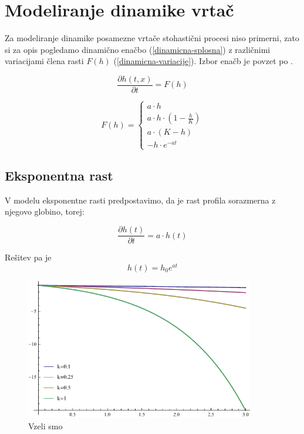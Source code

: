 \documentclass[a4paper, oneside, 12pt]{book}
\begin{document}
            \section{Modeliranje dinamike vrtač}

            Za modeliranje dinamike posamezne vrtače stohastični procesi niso primerni, zato si za opis pogledamo dinamično enačbo (\ref{dinamicna-splosna}) z različnimi variacijami člena rasti $F(h)$ (\ref{dinamicna-variacije}). Izbor enačb je povzet po \cite{kandler2010population}.

            \begin{equation}
              \frac{ \partial h(t,x) }{ \partial t} = F(h)
              \label{dinamicna-splosna}
            \end{equation}

          \begin{equation}
            F(h) = \left \{ \begin{array}{lr} 
            a \cdot h \\
            a \cdot h \cdot (1 - \frac{h}{K}) \\
            a \cdot (K - h) \\
            - h \cdot e^{-a t}
            \end{array} \right. 
            \label{dinamicna-variacije}
          \end{equation}

          \subsection{Eksponentna rast}

          V modelu eksponentne rasti predpostavimo, da je rast profila sorazmerna z njegovo globino, torej:

          \begin{equation}
            \frac{\partial h(t)}{\partial t} = a \cdot h(t)
          \end{equation}

          Rešitev pa je
          \begin{equation}
            h(t) = h_0 e^{a t}
          \end{equation}

            \begin{figure}[H]
              \begin{center}
                \includegraphics[width=10cm]{slike/eksponentna-rast}
              \end{center}
              \caption{Vzeli smo }
              \label{fig:eksponentna-rast}
            \end{figure}
\end{document}
